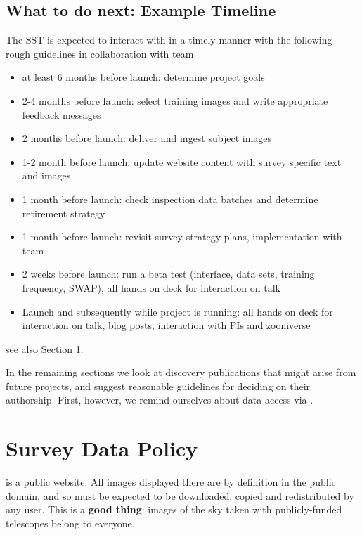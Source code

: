 \documentclass[a4paper,twocolumn]{article}
\begin{document}
\subsection{What to do next: Example Timeline}
The SST is expected to interact with \SW in a timely manner with the following rough guidelines in collaboration with \SW team
\begin{itemize}
\item at least 6 months before launch: determine project goals
\item 2-4 months before launch: select training images and write appropriate feedback messages
\item 2 months before launch: deliver and ingest subject images 
\item 1-2 month before launch: update website content with survey specific text and images
\item 1 month before launch: check inspection data batches and determine retirement strategy
\item 1 month before launch: revisit survey strategy plans, implementation with \SW team
\item 2 weeks before launch: run a beta test (interface, data sets, training frequency, SWAP), all hands on deck for interaction on talk
\item Launch and subsequently while project is running: all hands on deck for interaction on talk, blog posts, interaction with \SW PIs and zooniverse
\end{itemize}
see also Section \ref{sec:data}.

\hspace{6mm}

In the remaining sections we look at discovery publications that might
arise from future \SW projects, and suggest reasonable guidelines for
deciding on their authorship. First, however, we remind ourselves about data
access via \SW.



\section{Survey Data Policy}
\label{sec:data}

\SW is a public website. All images displayed there are by definition in the
public domain, and so must be expected to be downloaded, copied and
redistributed by any \SW user. This is a \textbf{good thing}: images of the sky taken
with publicly-funded telescopes belong to everyone. 
\end{document}
